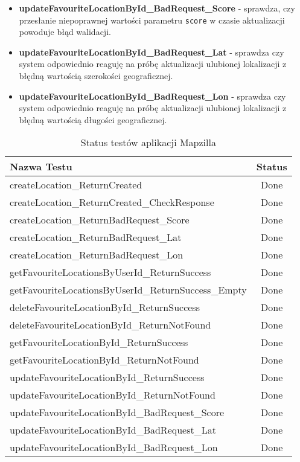 \documentclass{article}
\begin{document}
\begin{itemize}
      \item \textbf{updateFavouriteLocationById\_BadRequest\_Score} - sprawdza, czy przesłanie niepoprawnej wartości parametru \texttt{score} w czasie aktualizacji powoduje błąd walidacji.
      \item \textbf{updateFavouriteLocationById\_BadRequest\_Lat} - sprawdza czy system odpowiednio reaguję na próbę aktualizacji ulubionej lokalizacji z błędną wartością  szerokości geograficznej.
      \item \textbf{updateFavouriteLocationById\_BadRequest\_Lon} - sprawdza czy system odpowiednio reaguję na próbę aktualizacji ulubionej lokalizacji z błędną wartością długości geograficznej.
    
\end{itemize}

\begin{table}[h!]
\centering
\begin{tabular}{|l|c|}
\hline
\textbf{Nazwa Testu} & \textbf{Status} \\
\hline
createLocation\_ReturnCreated & Done \\
createLocation\_ReturnCreated\_CheckResponse & Done \\
createLocation\_ReturnBadRequest\_Score & Done \\
createLocation\_ReturnBadRequest\_Lat & Done \\
createLocation\_ReturnBadRequest\_Lon & Done \\
getFavouriteLocationsByUserId\_ReturnSuccess & Done \\
getFavouriteLocationsByUserId\_ReturnSuccess\_Empty & Done \\
deleteFavouriteLocationById\_ReturnSuccess & Done \\
deleteFavouriteLocationById\_ReturnNotFound & Done \\
getFavouriteLocationById\_ReturnSuccess & Done \\
getFavouriteLocationById\_ReturnNotFound & Done \\
updateFavouriteLocationById\_ReturnSuccess & Done \\
updateFavouriteLocationById\_ReturnNotFound & Done \\
updateFavouriteLocationById\_BadRequest\_Score & Done \\
updateFavouriteLocationById\_BadRequest\_Lat & Done \\
updateFavouriteLocationById\_BadRequest\_Lon & Done \\
\hline
\end{tabular}
\caption{Status testów aplikacji Mapzilla}
\end{table}
\end{document}
